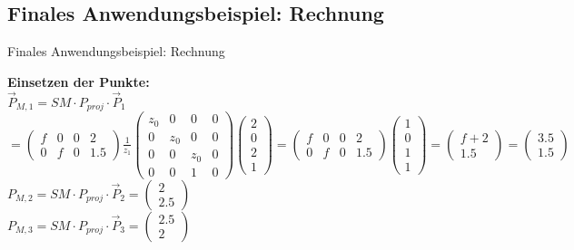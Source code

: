 \documentclass[10pt,aspectratio=169]{beamer}
\begin{document}
  \subsection{Finales Anwendungsbeispiel: Rechnung}
  \begin{frame}{Finales Anwendungsbeispiel: Rechnung}
    
      \textbf{Einsetzen der Punkte:}\\
      $\vec{P}_{M, 1} = SM \cdot P_{proj} \cdot \vec{P}_1$$= \begin{pmatrix}
        f & 0 & 0 & 2\\
        0 & f & 0 & 1.5
      \end{pmatrix}
      \frac{1}{z_1}
      \begin{pmatrix}
        z_0 & 0 & 0 & 0\\
        0 & z_0 & 0 & 0\\
        0 & 0 & z_0 & 0\\
        0 & 0 & 1 & 0
      \end{pmatrix}
      \begin{pmatrix}
        2\\0\\2\\1
      \end{pmatrix}
      =
      \begin{pmatrix}
        f & 0 & 0 & 2\\
        0 & f & 0 & 1.5
      \end{pmatrix}
      \begin{pmatrix}
        1\\0\\1\\1
      \end{pmatrix}
      = \begin{pmatrix}
        f + 2\\1.5
      \end{pmatrix}
      = \begin{pmatrix}
        3.5\\
        1.5
      \end{pmatrix}
      $\\
      $P_{M,2} = SM \cdot P_{proj} \cdot \vec{P}_2 = \begin{pmatrix}
        2\\2.5
      \end{pmatrix}$\\\vspace{0.2cm}
      $P_{M,3} = SM \cdot P_{proj} \cdot \vec{P}_3 = \begin{pmatrix}
        2.5\\2
      \end{pmatrix}$
  \end{frame}
\end{document}
